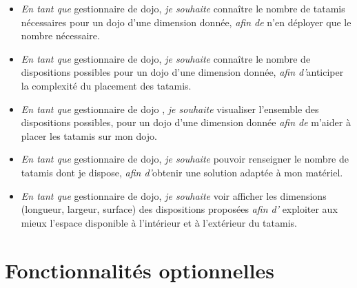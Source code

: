\begin{itemize}
    \item \emph{En tant que} gestionnaire de dojo, 
    \emph{ je souhaite} connaître le nombre de tatamis nécessaires pour un dojo d'une dimension donnée,
    \emph{afin de } n’en déployer que le nombre nécessaire.
    \item \emph{En tant que} gestionnaire de dojo,
    \emph{ je souhaite} connaître le nombre de dispositions possibles pour un dojo d'une dimension donnée, 
    \emph{ afin d'}anticiper la complexité du placement des tatamis.
    \item \emph{En tant que} gestionnaire de dojo ,
    \emph{ je souhaite} visualiser l'ensemble des dispositions possibles, pour un dojo d'une dimension donnée
    \emph{afin de } m’aider à placer les tatamis sur mon dojo.
    \item \emph{En tant que} gestionnaire de dojo, 
    \emph{ je souhaite} pouvoir renseigner le nombre de tatamis dont je dispose, 
    \emph{afin d'}obtenir une solution adaptée à mon matériel.
    \item \emph{En tant que} gestionnaire de dojo,
    \emph{ je souhaite} voir afficher les dimensions (longueur, largeur, surface) des dispositions proposées  
    \emph{ afin d' }exploiter aux mieux l'espace disponible à l'intérieur et à l'extérieur du tatamis.
\end{itemize}


\section{Fonctionnalités optionnelles}


